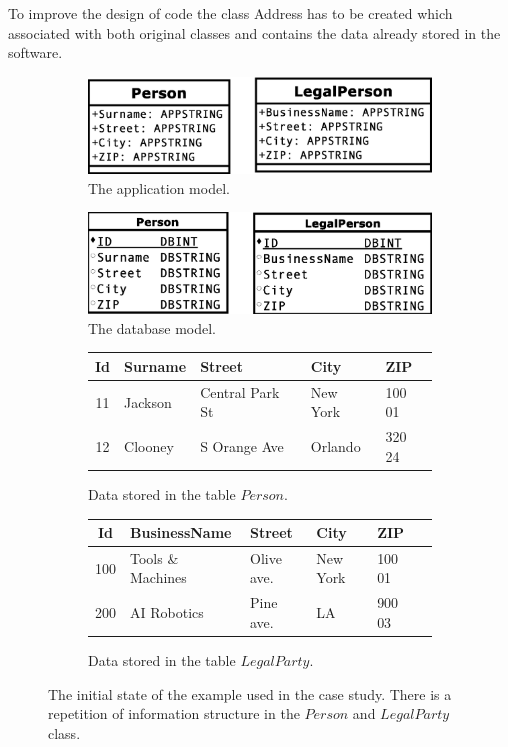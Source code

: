 \documentclass[runningheads]{comsis}
\begin{document}
To improve the design of code the class Address has to be created which associated with both original classes and contains the data already stored in the software. 
\begin{figure}
\begin{subfigure}[b]{0.45\textwidth}
	\includegraphics[width=\textwidth]{./images/case_app_1}
	\caption{The application model.}
\end{subfigure}
\quad
\begin{subfigure}[b]{0.45\textwidth}
	\includegraphics[width=\textwidth]{./images/case_db_1}
	\caption{The database model.}
\end{subfigure}
\begin{subfigure}[b]{\textwidth}
	\centering
	\begin{tabular}{| c | l | l | l | l | }
	 	\hline
		Id &  Surname & Street & City & ZIP  \\ \hline  
		11 & Jackson & Central Park St & New York & 100 01  \\ \hline
		12 & Clooney & S Orange Ave & Orlando & 320 24  \\ \hline
	\end{tabular}
	\caption{Data stored in the table $Person$.}
\end{subfigure}
\begin{subfigure}[b]{\textwidth}
	\centering
	\begin{tabular}{| c | l | l | l | l | c |}
	 	\hline
		Id &  BusinessName & Street & City & ZIP \\ \hline  
		100 & Tools \& Machines & Olive ave. & New York & 100 01 \\ \hline
		200 & AI Robotics & Pine ave. & LA & 900 03  \\ \hline
	\end{tabular}
	\caption{Data stored in the table $LegalParty$.}
\end{subfigure}
	\caption{The initial state of the example used in the case study. There is a repetition of information structure in the $Person$ and $LegalParty$ class.}
	\label{fig:case1}
\end{figure}
\end{document}
